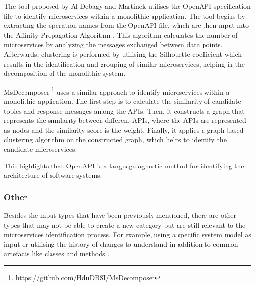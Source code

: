 The tool proposed by Al-Debagy and Martinek  utilises the
OpenAPI specification file to identify microservices within a monolithic
application. The tool begins by extracting the operation names from the OpenAPI
file, which are then input into the Affinity Propagation Algorithm
\cite{frey2007clustering}. This algorithm calculates the number of
microservices by analyzing the messages exchanged between data points.
Afterwards, clustering is performed by utilising the Silhouette coefficient
\cite{rousseeuw1987silhouettes} which results in the identification and
grouping of similar microservices, helping in the decomposition of the
monolithic system.

MsDecomposer \footnote{\url{https://github.com/HduDBSI/MsDecomposer}}
 uses a similar approach to identify microservices
within a monolithic application. The first step is to calculate the similarity
of candidate topics and response messages among the APIs. Then, it constructs a
graph that represents the similarity between different APIs, where the APIs are
represented as nodes and the similarity score is the weight. Finally, it
applies a graph-based clustering algorithm on the constructed graph, which
helps to identify the candidate microservices.

This highlights that OpenAPI is a language-agnostic method for identifying the
architecture of software systems.

\subsubsection*{Other}

Besides the input types that have been previously mentioned, there are other
types that may not be able to create a new category but are still relevant to
the microservices identification process. For example, using a specific system
model as input  or utilising the history of changes
to understand in addition to common artefacts like classes and methods
.
